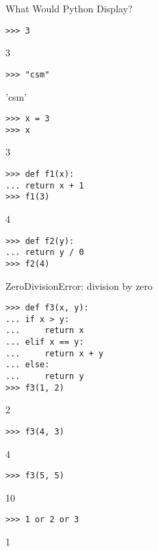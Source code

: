 \question What Would Python Display?

\begin{lstlisting}
>>> 3
\end{lstlisting}
\begin{solution}[.2in]
3
\end{solution}

\begin{lstlisting}
>>> "csm"
\end{lstlisting}
\begin{solution}[.2in]
'csm'
\end{solution}

\begin{lstlisting}
>>> x = 3
>>> x
\end{lstlisting}
\begin{solution}[.2in]
3
\end{solution}

\begin{lstlisting}
>>> def f1(x):
...	return x + 1
>>> f1(3)
\end{lstlisting}
\begin{solution}[.2in]
4
\end{solution}

\begin{lstlisting}
>>> def f2(y):
...	return y / 0
>>> f2(4)
\end{lstlisting}
\begin{solution}[.2in]
ZeroDivisionError: division by zero
\end{solution}

\begin{lstlisting}
>>> def f3(x, y):
...	if x > y:
...		return x
...	elif x == y:
...		return x + y
...	else:
...		return y
>>> f3(1, 2)
\end{lstlisting}
\begin{solution}[.2in]
2
\end{solution}

\begin{lstlisting}
>>> f3(4, 3)
\end{lstlisting}
\begin{solution}[.2in]
4
\end{solution}

\begin{lstlisting}
>>> f3(5, 5)
\end{lstlisting}
\begin{solution}[.2in]
10
\end{solution}

\begin{lstlisting}
>>> 1 or 2 or 3
\end{lstlisting}
\begin{solution}[.2in]
1
\end{solution}

